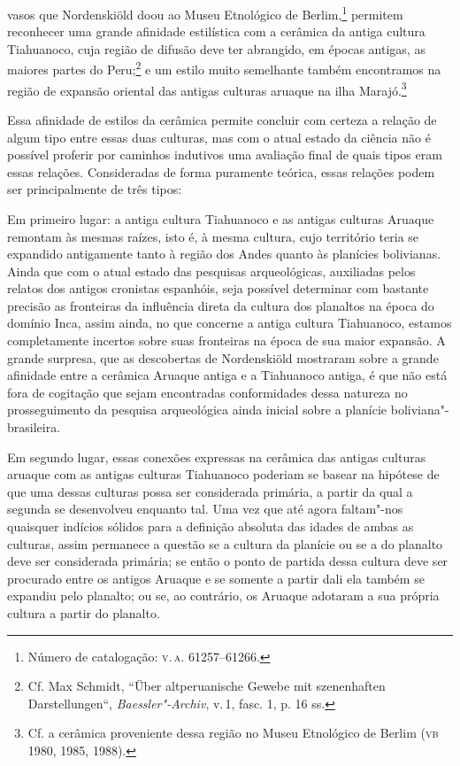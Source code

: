 vasos que Nordenskiöld doou ao Museu Etnológico de Berlim,\footnote{Número
  de catalogação: \textsc{v.\,a.} 61257--61266.} permitem reconhecer uma grande
afinidade estilística com a cerâmica da antiga cultura Tiahuanoco, cuja
região de difusão deve ter abrangido, em épocas antigas, as maiores
partes do Peru;\footnote{Cf. Max Schmidt, ``Über altperuanische Gewebe
  mit szenenhaften Darstellungen``, \emph{Baessler"-Archiv}, v.\,1, fasc.
  1, p. 16 ss.} e um estilo muito semelhante também encontramos na
região de expansão oriental das antigas culturas aruaque na ilha
Marajó.\footnote{Cf. a cerâmica proveniente dessa região no Museu
  Etnológico de Berlim (\textsc{vb} 1980, 1985, 1988).}

Essa afinidade de estilos da cerâmica permite concluir com certeza a
relação de algum tipo entre essas duas culturas, mas com o atual estado
da ciência não é possível proferir por caminhos indutivos uma avaliação
final de quais tipos eram essas relações. Consideradas de forma
puramente teórica, essas relações podem ser principalmente de três
tipos:

Em primeiro lugar: a antiga cultura Tiahuanoco e as antigas culturas
Aruaque remontam às mesmas raízes, isto é, à mesma cultura, cujo
território teria se expandido antigamente tanto à região dos Andes
quanto às planícies bolivianas. Ainda que com o atual estado das
pesquisas arqueológicas, auxiliadas pelos relatos dos antigos cronistas
espanhóis, seja possível determinar com bastante precisão as fronteiras
da influência direta da cultura dos planaltos na época do domínio Inca,
assim ainda, no que concerne a antiga cultura Tiahuanoco, estamos
completamente incertos sobre suas fronteiras na época de sua maior
expansão. A grande surpresa, que as descobertas de Nordenskiöld
mostraram sobre a grande afinidade entre a cerâmica Aruaque antiga e a
Tiahuanoco antiga, é que não está fora de cogitação que sejam
encontradas conformidades dessa natureza no prosseguimento da pesquisa
arqueológica ainda inicial sobre a planície boliviana"-brasileira.

Em segundo lugar, essas conexões expressas na cerâmica das antigas
culturas aruaque com as antigas culturas Tiahuanoco poderiam se basear
na hipótese de que uma dessas culturas possa ser considerada primária,
a partir da qual a segunda se desenvolveu enquanto tal. Uma vez que até
agora faltam"-nos quaisquer indícios sólidos para a definição absoluta
das idades de ambas as culturas, assim permanece a questão se a cultura
da planície ou se a do planalto deve ser considerada primária; se então
o ponto de partida dessa cultura deve ser procurado entre os antigos
Aruaque e se somente a partir dali ela também se expandiu pelo planalto;
ou se, ao contrário, os Aruaque adotaram a sua própria cultura a partir
do planalto.

